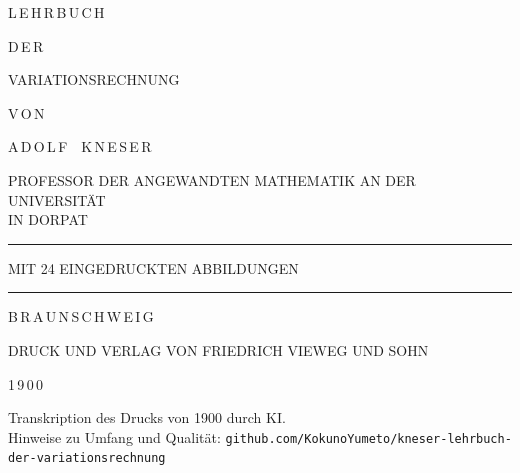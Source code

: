 \documentclass[11pt,a4paper,leqno]{article}
\begin{document}
\begin{titlepage}
\centering
\vspace*{20mm}
{\Huge L\,E\,H\,R\,B\,U\,C\,H}\par\vspace{7mm}
{\small D\,E\,R}\par\vspace{7mm}
{\Huge VARIATIONSRECHNUNG}\par\vspace{12mm}
{\small V\,O\,N}\par\vspace{9mm}
{\LARGE A\,D\,O\,L\,F\ \ K\,N\,E\,S\,E\,R}\par\vspace{2mm}
{\scriptsize PROFESSOR DER ANGEWANDTEN MATHEMATIK AN DER UNIVERSITÄT\\[1mm] IN DORPAT}\par
\vspace{8mm}\rule{30mm}{0.4pt}\par\vspace{22mm}
{\footnotesize MIT 24 EINGEDRUCKTEN ABBILDUNGEN}\par
\vspace{30mm}
\rule{0.85\linewidth}{0.8pt}\par\vspace{5mm}
{\large B\,R\,A\,U\,N\,S\,C\,H\,W\,E\,I\,G}\par\vspace{2mm}
{\footnotesize DRUCK UND VERLAG VON FRIEDRICH VIEWEG UND SOHN}\par\vspace{2mm}
{\large 1\,9\,0\,0}\par
\vfill
{\footnotesize Transkription des Drucks von 1900 durch KI.\\
Hinweise zu Umfang und Qualität: \texttt{github.com/KokunoYumeto/kneser-lehrbuch-der-variationsrechnung}}\par
\end{titlepage}


\end{document}
